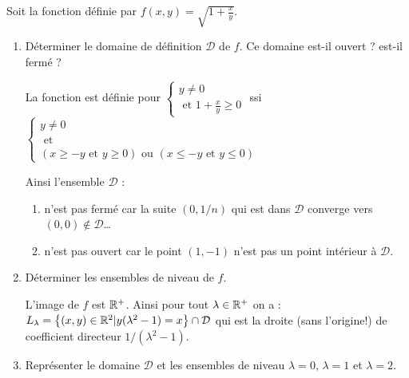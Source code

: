 \documentclass[a4paper]{article}
\begin{document}
 Soit la fonction définie par $f(x,y) =\sqrt{1+\frac{x}{y}}$.
\begin{enumerate}
	\item Déterminer le domaine de définition $\mathcal D$ de $f$. Ce domaine est-il ouvert ? est-il fermé ?

		\bigskip

		La fonction est définie pour $\begin{cases}
			y \neq 0 \\
			\text{ et }
			1 + \frac{x}{y} \geq 0
		\end{cases} $ ssi  $\begin{cases}
			y \neq 0 \\
			\text{ et } \\
			(x\geq -y \text{ et } y\geq 0) \text{ ou } (x \leq -y  \text{ et } y\leq 0)
		\end{cases} $ 

		Ainsi l'ensemble $\mathcal D$ :
		\begin{enumerate}
			\item n'est pas fermé car la suite $(0,1/n)$ qui est dans $\mathcal D$ converge vers $(0,0) \notin \mathcal D$\ldots
			\item n'est pas ouvert car le point $(1,-1)$ n'est pas un point intérieur à $\mathcal D$.
		\end{enumerate}

\bigskip
	\item Déterminer les ensembles de niveau de $f$.

		\bigskip
		L'image de $f$ est $\mathbb{R}^+$. Ainsi pour tout $\lambda \in \mathbb{R}^+$ on a : $L_\lambda = \left\{ (x,y) \in \mathbb{R}^2 | y (\lambda^2 - 1) = x \right\} \cap \mathcal D$ qui est la droite (sans l'origine!) de coefficient directeur $1 / (\lambda^2 -1)$.
		 \bigskip

	\item Représenter le domaine $\mathcal D$ et les ensembles de niveau $\lambda =0$, $\lambda= 1$ et $\lambda = 2$.
		\begin{center}
\end{center}
\end{enumerate}
\end{document}
